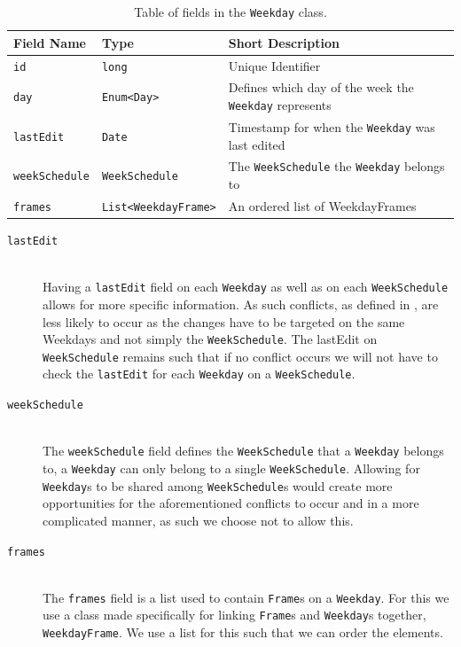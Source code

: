 \begin{table}[H]
    \footnotesize
    \centering
    \begin{tabularx}{\textwidth}{ l l X }
        \textbf{Field Name} & \textbf{Type}                                     & \textbf{Short Description}                                    \\
        \midrule
        \texttt{id}           & \texttt{long}                                   & Unique Identifier                                             \\
        \texttt{day}          & \texttt{Enum\textless Day\textgreater}          & Defines which day of the week the \texttt{Weekday} represents \\
        \texttt{lastEdit}     & \texttt{Date}                                   & Timestamp for when the \texttt{Weekday} was last edited       \\
        \texttt{weekSchedule} & \texttt{WeekSchedule}                           & The \texttt{WeekSchedule} the \texttt{Weekday} belongs to     \\
        \texttt{frames}       & \texttt{List\textless WeekdayFrame\textgreater} & An ordered list of WeekdayFrames
    \end{tabularx}
    \caption{Table of fields in the \texttt{Weekday} class.}
    \label{tbl:Weekday}
\end{table}

\begin{description}
    \item [\texttt{lastEdit}] \hfill \\
    Having a \texttt{lastEdit} field on each \texttt{Weekday} as well as on each \texttt{WeekSchedule} allows for more specific information.
    As such conflicts, as defined in , are less likely to occur as the changes have to be targeted on the same Weekdays and not simply the \texttt{WeekSchedule}.
    The lastEdit on \texttt{WeekSchedule} remains such that if no conflict occurs we will not have to check the \texttt{lastEdit} for each \texttt{Weekday} on a \texttt{WeekSchedule}.
    \item [\texttt{weekSchedule}] \hfill \\
    The \texttt{weekSchedule} field defines the \texttt{WeekSchedule} that a \texttt{Weekday} belongs to, a \texttt{Weekday} can only belong to a single \texttt{WeekSchedule}.
    Allowing for \texttt{Weekday}s to be shared among \texttt{WeekSchedule}s would create more opportunities for the aforementioned conflicts to occur and in a more complicated manner, as such we choose not to allow this.
    \item [\texttt{frames}] \hfill \\
    The \texttt{frames} field is a list used to contain \texttt{Frame}s on a \texttt{Weekday}.
    For this we use a class made specifically for linking \texttt{Frame}s and \texttt{Weekday}s together, \texttt{WeekdayFrame}.
    We use a list for this such that we can order the elements.
\end{description}

